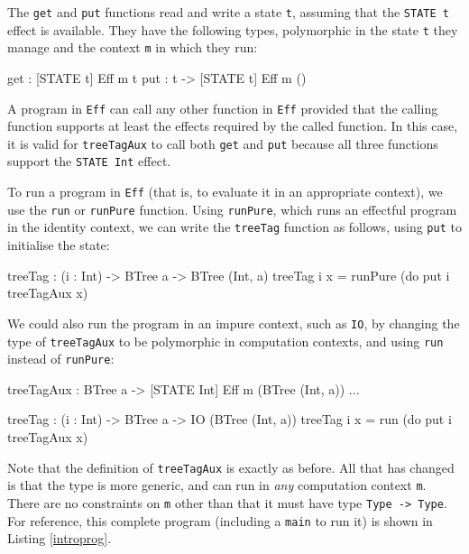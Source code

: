 \noindent
The \texttt{get} and \texttt{put} functions read and write a state \texttt{t}, 
assuming that the \texttt{STATE t} effect is available. They have the following
types, polymorphic in the state \texttt{t} they manage and the context
\texttt{m} in which they run:

\begin{code}
get :      { [STATE t] } Eff m t
put : t -> { [STATE t] } Eff m () 
\end{code}

\noindent
A program in \texttt{Eff} can call any other function in \texttt{Eff} provided
that the calling function supports at least the effects required by the called
function. In this case, it is valid for \texttt{treeTagAux} to call both
\texttt{get} and \texttt{put} because all three functions support the
\texttt{STATE Int} effect.

To run a program in \texttt{Eff} (that is, to evaluate it in an appropriate
context), we use the \texttt{run} or \texttt{runPure} function. Using 
\texttt{runPure}, which runs an effectful program in the identity context,
we can write the \texttt{treeTag} function as follows, using \texttt{put}
to initialise the state:

\begin{code}
treeTag : (i : Int) -> BTree a -> BTree (Int, a)
treeTag i x = runPure (do put i
                          treeTagAux x)
\end{code}

\noindent
We could also run the program in an impure context, such as \texttt{IO},
by changing the type of \texttt{treeTagAux} to be polymorphic in computation
contexts, and using \texttt{run} instead of \texttt{runPure}:

\begin{code}
treeTagAux : BTree a -> { [STATE Int] } Eff m (BTree (Int, a))
...

treeTag : (i : Int) -> BTree a -> IO (BTree (Int, a))
treeTag i x = run (do put i
                      treeTagAux x)
\end{code}

\noindent
Note that the definition of \texttt{treeTagAux} is exactly as before. All that
has changed is that the type is more generic, and can run in \emph{any}
computation context \texttt{m}. There are no constraints on \texttt{m} other
than that it must have type \texttt{Type -> Type}. For reference, this
complete program (including a \texttt{main} to run it) is shown in
Listing \ref{introprog}.


